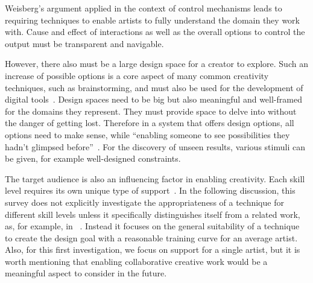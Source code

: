Weisberg's argument applied in the context of control mechanisms leads to requiring techniques to enable artists to fully understand the domain they work with. Cause and effect of interactions as well as the overall options to control the output must be transparent and navigable.

However, there also must be a large design space for a creator to explore. 
Such an increase of possible options is a core aspect of many common creativity techniques, such as brainstorming, and must also be used for the development of digital tools~\cite{terry_2004_vea}. Design spaces need to be big but also meaningful and well-framed for the domains they represent. They must provide space to delve into without the danger of getting lost. 
Therefore in a system that offers design options, all options need to make sense, while ``enabling someone to see possibilities they hadn't glimpsed before''~\cite{boden_2010_cat}. For the discovery of unseen results, various stimuli can be given, for example well-designed constraints. 


The target audience is also an influencing factor in enabling creativity. Each skill level requires its own unique type of support~\cite{cherry_2014_qcs}. 
In the following discussion, this survey does not explicitly investigate the appropriateness of a technique for different skill levels unless it specifically distinguishes itself from a related work, as, for example, in \citeauthor*{benedetti_2014_pba}~\cite{benedetti_2014_pba}. Instead it focuses on the general suitability of a technique to create the design goal with a reasonable training curve for an average artist. Also, for this first investigation, we focus on support for a single artist, but it is worth mentioning that enabling collaborative creative work would be a meaningful aspect to consider in the future.

